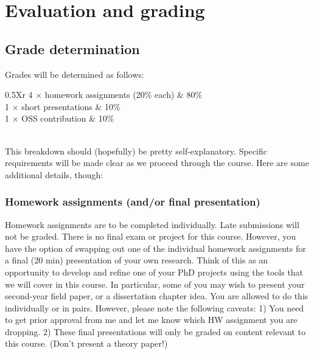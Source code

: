 \documentclass[12]{article}
\begin{document}
\section*{Evaluation and grading}

\subsection*{Grade determination}


Grades will be determined as follows:

\begin{table}[!h] \centering 
	\label{tab:grades} 
	\begin{tabularx}{0.5\textwidth}{Xr} 
		\toprule
		4 $\times$ homework assignments (20\% each)	& 80\% \\
		1 $\times$ short presentations							& 10\% \\
		1 $\times$ OSS contribution					& 10\% \\
		\bottomrule
		\\
	\end{tabularx} 
\end{table} 

This breakdown should (hopefully) be pretty self-explanatory. Specific requirements will be made clear as we proceed through the course. Here are some additional details, though:

\vspace{-0.25cm}
\subsubsection*{Homework assignments (and/or final presentation)}

Homework assignments are to be completed individually. Late submissions will not be graded. There is no final exam or project for this course. However, you have the option of swapping out one of the individual homework assignments for a final (20 min) presentation of your own research. Think of this as an opportunity to develop and refine one of your PhD projects using the tools that we will cover in this course. In particular, some of you may wish to present your second-year field paper, or a dissertation chapter idea. You are allowed to do this individually or in pairs. However, please note the following caveats: 1) You need to get prior approval from me and let me know which HW assignment you are dropping. 2) These final presentations will only be graded on content relevant to this course. (Don't present a theory paper!)
\end{document}
